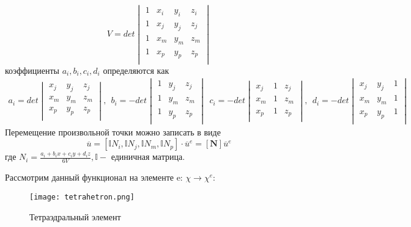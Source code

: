 \documentclass[a4paper,12pt]{article}
\begin{document}
\begin{equation}
    V = det
    \begin{vmatrix}
1 & x_i & y_i & z_i \\ 
1 & x_j & y_j & z_j \\ 
1 & x_m & y_m & z_m \\ 
1 & x_p & y_p & z_p \\
    \end{vmatrix}
\end{equation}
коэффициенты $a_i, b_i, c_i, d_i$ определяются как
\begin{align}
    a_i =    det 
    \begin{vmatrix}
 x_j & y_j & z_j \\ 
x_m & y_m & z_m \\ 
x_p & y_p & z_p \\
    \end{vmatrix},
\:\: b_i  = -det 
    \begin{vmatrix} 
1 & y_j & z_j \\ 
1 & y_m & z_m \\ 
1 & y_p & z_p \\
    \end{vmatrix}
\:\: c_i =     -det \begin{vmatrix}
 x_j & 1 & z_j \\ 
x_m & 1 & z_m \\ 
x_p & 1 & z_p \\
    \end{vmatrix},
\:\: d_i =     -det\begin{vmatrix}
 x_j & y_j & 1 \\ 
x_m & y_m & 1 \\ 
x_p & y_p & 1 \\
    \end{vmatrix}
\end{align}
Перемещение произвольной точки можно записать в виде 
\begin{equation}
    \overline{u} = [\mathbb{I} N_i,\mathbb{I} N_j,\mathbb{I} N_m,\mathbb{I} N_p] \cdot \overline{u}^e = [\textbf{N}] \overline{u}^e
\end{equation}
где $N_i = \frac{a_i + b_ix + c_i y + d_i z}{6V}, \mathbb{I} - $ единичная матрица. \par
Рассмотрим данный функционал на элементе e: $\chi \rightarrow \chi^e$:

\begin{figure}[H]
    \centering
    \texttt{[image: tetrahetron.png]}
    \caption{Тетраэдральный элемент}
    \label{fig:enter-label}
\end{figure}
\end{document}
